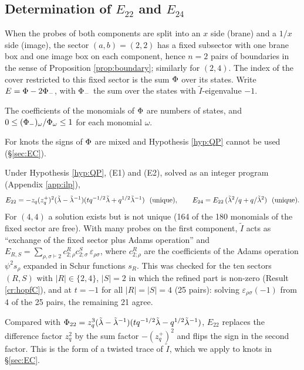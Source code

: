 \subsection{Determination of \texorpdfstring{$E_{22}$ and $E_{24}$}{E22 and E24}}\label{sec:E22}
When the probes of both components are split into an $x$ side (brane) and a $1/x$ side (image), the sector $(a,b) = (2,2)$ has a fixed subsector with one brane box and one image box on each component, hence $n = 2$ pairs of boundaries in the sense of Proposition \ref{prop:boundary}; similarly for $(2,4)$. The index of the cover restricted to this fixed sector is the sum $\Phi$ over its states. Write $E = \Phi - 2\Phi_-$, with $\Phi_-$ the sum over the states with $\tilde I$-eigenvalue $-1$.
\begin{hypothesis}\label{hyp:QP}
The coefficients of the monomials of $\Phi$ are numbers of states, and $0 \le (\Phi_-)_\omega/\Phi_\omega \le 1$ for each monomial $\omega$.
\end{hypothesis}
For knots the signs of $\Phi$ are mixed and Hypothesis \ref{hyp:QP} cannot be used (\S\ref{sec:EC}).
\begin{result}\label{cr:E22}
Under Hypothesis \ref{hyp:QP}, (E1) and (E2), solved as an integer program (Appendix \ref{app:ilp}),
\begin{equation}\label{eq:E22}
E_{22} = -z_q (z_q^+)^2(\tilde\lambda - \tilde\lambda^{-1})(t q^{-1/2}\tilde\lambda + q^{1/2}\tilde\lambda^{-1})\ \ (\text{unique}),\qquad
E_{24} = E_{22}\,(\tilde\lambda^2/q + q/\tilde\lambda^2)\ \ (\text{unique}).
\end{equation}
For $(4,4)$ a solution exists but is not unique (164 of the 180 monomials of the fixed sector are free).
With many probes on the first component, $\tilde I$ acts as ``exchange of the fixed sector plus Adams operation'' and $E_{R,S} = \sum_{\rho, \sigma\vdash 2} c^R_{2;\rho}c^S_{2;\sigma}\,\varepsilon_{\rho\sigma}$, where $c^R_{2;\rho}$ are the coefficients of the Adams operation $\psi^2 s_\rho$ expanded in Schur functions $s_R$. This was checked for the ten sectors $(R, S)$ with $|R| \in \{2, 4\}$, $|S| = 2$ in which the refined part is non-zero (Result \ref{cr:hopfC}), and at $t = -1$ for all $|R| = |S| = 4$ (25 pairs): solving $\varepsilon_{\rho\sigma}(-1)$ from 4 of the 25 pairs, the remaining 21 agree.
\end{result}
Compared with $\Phi_{22} = z_q^3(\tilde\lambda - \tilde\lambda^{-1})(tq^{-1/2}\tilde\lambda - q^{1/2}\tilde\lambda^{-1})$, $E_{22}$ replaces the difference factor $z_q^2$ by the sum factor $-(z_q^+)^2$ and flips the sign in the second factor. This is the form of a twisted trace of $\tilde I$, which we apply to knots in \S\ref{sec:EC}.

